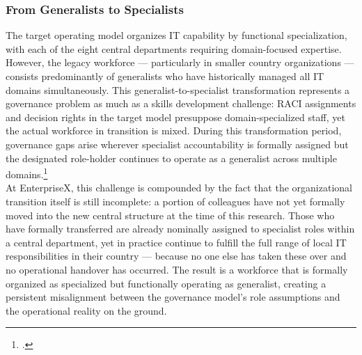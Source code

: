 \subsubsection{From Generalists to Specialists}
\label{subsubsec:GeneralistToSpecialistTransition}
The target operating model organizes IT capability by functional specialization, with each of the eight central departments requiring domain-focused expertise.
However, the legacy workforce — particularly in smaller country organizations — consists predominantly of generalists who have historically managed all IT domains simultaneously.
This generalist-to-specialist transformation represents a governance problem as much as a skills development challenge: \ac{RACI} assignments and decision rights in the target model presuppose domain-specialized staff, yet the actual workforce in transition is mixed.
During this transformation period, governance gaps arise wherever specialist accountability is formally assigned but the designated role-holder continues to operate as a generalist across multiple domains.\footcite[26-27]{klotzCausingFactorsOutcomes2019}
\\
At EnterpriseX, this challenge is compounded by the fact that the organizational transition itself is still incomplete: a portion of colleagues have not yet formally moved into the new central structure at the time of this research.
Those who have formally transferred are already nominally assigned to specialist roles within a central department, yet in practice continue to fulfill the full range of local IT responsibilities in their country — because no one else has taken these over and no operational handover has occurred.
The result is a workforce that is formally organized as specialized but functionally operating as generalist, creating a persistent misalignment between the governance model's role assumptions and the operational reality on the ground.

